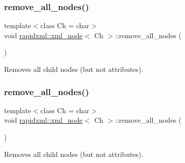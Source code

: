 \subsubsection{\texorpdfstring{remove\+\_\+all\+\_\+nodes()}{remove\_all\_nodes()}\hspace{0.1cm}{\footnotesize\ttfamily [1/2]}}
{\footnotesize\ttfamily template$<$class Ch = char$>$ \\
void \mbox{\hyperlink{classrapidxml_1_1xml__node}{rapidxml\+::xml\+\_\+node}}$<$ Ch $>$\+::remove\+\_\+all\+\_\+nodes (\begin{DoxyParamCaption}{ }\end{DoxyParamCaption})\hspace{0.3cm}{\ttfamily [inline]}}



Removes all child nodes (but not attributes). 

\mbox{\label{classrapidxml_1_1xml__node_a95735358b079ae0adcfbbac69aa1fbc3}} 
\subsubsection{\texorpdfstring{remove\+\_\+all\+\_\+nodes()}{remove\_all\_nodes()}\hspace{0.1cm}{\footnotesize\ttfamily [2/2]}}
{\footnotesize\ttfamily template$<$class Ch = char$>$ \\
void \mbox{\hyperlink{classrapidxml_1_1xml__node}{rapidxml\+::xml\+\_\+node}}$<$ Ch $>$\+::remove\+\_\+all\+\_\+nodes (\begin{DoxyParamCaption}{ }\end{DoxyParamCaption})\hspace{0.3cm}{\ttfamily [inline]}}



Removes all child nodes (but not attributes). 

\mbox{\label{classrapidxml_1_1xml__node_a6f97b1b4f46a94a4587915df3c0c6b57}} 
